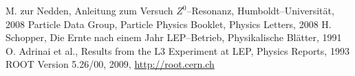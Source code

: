 \renewcommand{\refname}{Literatur und Programme}
\begin{thebibliography}{xxxxxx}
M. zur Nedden, Anleitung zum Versuch $Z^0$–Resonanz, Humboldt–Universität, 2008
Particle Data Group, Particle Physics Booklet, Physics Letters, 2008
H. Schopper, Die Ernte nach einem Jahr LEP–Betrieb, Physikalische Blätter, 1991
O. Adrinai et al., Results from the L3 Experiment at LEP,  Physics Reports, 1993
ROOT Version 5.26/00, 2009, \href{http://root.cern.ch}{http://root.cern.ch}
\end{thebibliography}